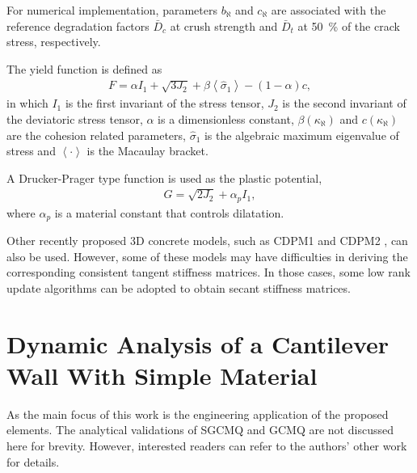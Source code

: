 \documentclass[3p,sort&compress,review,11pt,fleqn]{elsarticle}
\begin{document}
For numerical implementation, parameters $b_\aleph$ and $c_\aleph$ are associated with the reference degradation factors $\bar{D}_c$ at crush strength and $\bar{D}_t$ at \SI{50}{\percent} of the crack stress, respectively. 

The yield function is defined as
\begin{gather}
F=\alpha{}I_1+\sqrt{3J_2}+\beta\left\langle\hat\sigma_{1}\right\rangle-\left(1-\alpha\right)c,
\end{gather}
in which $I_1$ is the first invariant of the stress tensor, $J_2$ is the second invariant of the deviatoric stress tensor, $\alpha$ is a dimensionless constant, $\beta(\kappa_\aleph)$ and $c(\kappa_\aleph)$ are the cohesion related parameters, $\hat\sigma_{1}$ is the algebraic maximum eigenvalue of stress and $\left\langle\cdot\right\rangle$ is the Macaulay bracket.

A Drucker-Prager type function is used as the plastic potential,
\begin{gather}
G=\sqrt{2J_2}+\alpha_p{}I_1,
\end{gather}
where $\alpha_p$ is a material constant that controls dilatation.

Other recently proposed 3D concrete models, such as CDPM1 \citep{Grassl2006} and CDPM2 \citep{Grassl2013}, can also be used. However, some of these models may have difficulties in deriving the corresponding consistent tangent stiffness matrices. In those cases, some low rank update algorithms \citep[e.g.,][]{Shanno1970} can be adopted to obtain secant stiffness matrices.
\section{Dynamic Analysis of a Cantilever Wall With Simple Material}
As the main focus of this work is the engineering application of the proposed elements. The analytical validations of SGCMQ and GCMQ are not discussed here for brevity. However, interested readers can refer to the authors' other work \citep{Chang2019,Chang2019a,Chang2020} for details.
\end{document}
